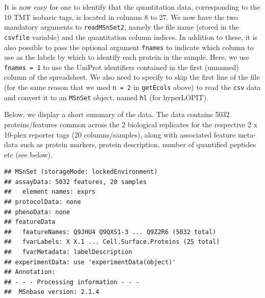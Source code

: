 It is now easy for one to identify that the quantitation data,
corresponding to the 10 TMT isobaric tags, is located in columns 8
to 27. We now have the two mandatory arguments to \texttt{readMSnSet2},
namely the file name (stored in the \texttt{csvfile} variable) and the
quantitation column indices. In addition to these, it is also possible
to pass the optional argument \texttt{fnames} to indicate which column to use
as the labels by which to identify each protein in the sample. Here,
we use \texttt{fnames = 1} to use the UniProt identifiers contained in the
first (unnamed) column of the spreadsheet. We also need to specify to
skip the first line of the file (for the same reason that we used 
\texttt{n = 2} in \texttt{getEcols} above) to read the \texttt{csv} data and convert it to an
\texttt{MSnSet} object, named \texttt{hl} (for hyperLOPIT).

\begin{knitrout}
\color{fgcolor}\begin{kframe}
\begin{alltt}
 \hlkwb{<-}   \hlstd{=} \hlopt{:}\hlstd{,}  \hlstd{=} \hlstd{,}  \hlstd{=} \hlstd{)}
\end{alltt}
\end{kframe}
\end{knitrout}

Below, we display a short summary of the data. The data contains 
5032 proteins/features common across the 2 biological replicates
for the respective 2 x 10-plex reporter tags (20
columns/samples), along with associated feature meta-data such as
protein markers, protein description, number of quantified peptides
etc (see below).


\begin{knitrout}
\color{fgcolor}\begin{kframe}
\begin{alltt}
\end{alltt}
\begin{verbatim}
## MSnSet (storageMode: lockedEnvironment)
## assayData: 5032 features, 20 samples 
##   element names: exprs 
## protocolData: none
## phenoData: none
## featureData
##   featureNames: Q9JHU4 Q9QXS1-3 ... Q9Z2R6 (5032 total)
##   fvarLabels: X X.1 ... Cell.Surface.Proteins (25 total)
##   fvarMetadata: labelDescription
## experimentData: use 'experimentData(object)'
## Annotation:  
## - - - Processing information - - -
##  MSnbase version: 2.1.4
\end{verbatim}
\end{kframe}
\end{knitrout}

